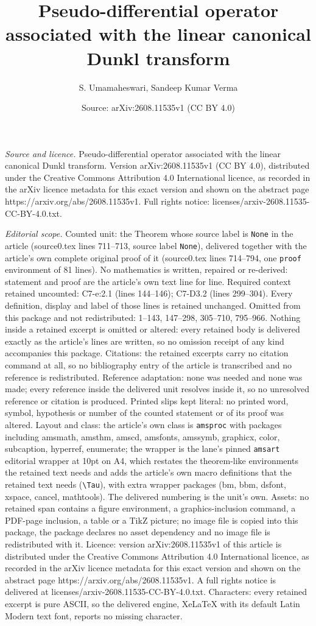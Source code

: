 \documentclass[10pt,a4paper]{amsart}
\title[Pseudo-differential operator associated with the linear cano]{Pseudo-differential operator associated with the linear canonical Dunkl transform}
\author{S. Umamaheswari, Sandeep Kumar Verma}
\date{Source: arXiv:2608.11535v1 (CC BY 4.0)}
\begin{document}
\maketitle

\noindent\emph{Source and licence.} Pseudo-differential operator associated with the linear canonical Dunkl transform. Version arXiv:2608.11535v1 (CC BY 4.0), distributed under the Creative Commons Attribution 4.0 International licence, as recorded in the arXiv licence metadata for this exact version and shown on the abstract page https://arxiv.org/abs/2608.11535v1. Full rights notice: licenses/arxiv-2608.11535-CC-BY-4.0.txt.\par\smallskip

\noindent\textit{Editorial scope.} Counted unit: the Theorem whose source label is \texttt{None} in the article (source0.tex lines 711--713, source label \texttt{None}), delivered together with the article's own complete original proof of it (source0.tex lines 714--794, one \texttt{proof} environment of 81 lines). No mathematics is written, repaired or re-derived: statement and proof are the article's own text line for line. Required context retained uncounted: C7-e:2.1 (lines 144--146); C7-D3.2 (lines 299--304). Every definition, display and label of those lines is retained unchanged. Omitted from this package and not redistributed: 1--143, 147--298, 305--710, 795--966. Nothing inside a retained excerpt is omitted or altered: every retained body is delivered exactly as the article's lines are written, so no omission receipt of any kind accompanies this package. Citations: the retained excerpts carry no citation command at all, so no bibliography entry of the article is transcribed and no reference is redistributed. Reference adaptation: none was needed and none was made; every reference inside the delivered unit resolves inside it, so no unresolved reference or citation is produced. Printed slips kept literal: no printed word, symbol, hypothesis or number of the counted statement or of its proof was altered. Layout and class: the article's own class is \texttt{amsproc} with packages including amsmath, amsthm, amscd, amsfonts, amssymb, graphicx, color, subcaption, hyperref, enumerate; the wrapper is the lane's pinned \texttt{amsart} editorial wrapper at 10pt on A4, which restates the theorem-like environments the retained text needs and adds the article's own macro definitions that the retained text needs (\texttt{\textbackslash Tau}), with extra wrapper packages (bm, bbm, dsfont, xspace, cancel, mathtools). The delivered numbering is the unit's own. Assets: no retained span contains a figure environment, a graphics-inclusion command, a PDF-page inclusion, a table or a TikZ picture; no image file is copied into this package, the package declares no asset dependency and no image file is redistributed with it. Licence: version arXiv:2608.11535v1 of this article is distributed under the Creative Commons Attribution 4.0 International licence, as recorded in the arXiv licence metadata for this exact version and shown on the abstract page https://arxiv.org/abs/2608.11535v1. A full rights notice is delivered at licenses/arxiv-2608.11535-CC-BY-4.0.txt. Characters: every retained excerpt is pure ASCII, so the delivered engine, XeLaTeX with its default Latin Modern text font, reports no missing character.
\end{document}
